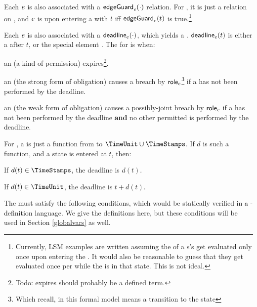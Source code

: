 \documentclass[12pt]{article}
\begin{document}
Each \transition $e$ is also associated with a  $\textsf{edgeGuard}_{e}(\cdot)$ relation. For \FSContracts, it is just a relation on \TimeStamps,
and \atransition $e$ is  upon entering a \GlobalState with \TimeStamp $t$ iff $\textsf{edgeGuard}_{e}(t)$ is true.\footnote{Currently, LSM examples are written assuming the \TGuards of a \State s's \transitions get evaluated only once upon entering the \State. It would also be reasonable to guess that they get evaluated once per \TimeUnit while the \Contract is in that state. This is not ideal.}

\medskip

Each \transition $e$ is also associated with a  $\textsf{deadline}_{e}(\cdot)$, which yields a . $\textsf{deadline}_{e}(t)$ is either a \TimeStamp after $t$, or the special element . The \Deadline for \atransition is when:

\begin{LPPI}
	\item an \enabled \mayntran (a kind of permission) expires\footnote{Todo: expires should probably be a defined term.}.
	\item an \enabled \mustntran (the strong form of obligation) causes a breach by $\textsf{role}_{e}$\footnote{Which recall, in this formal model means a transition to the state \breached{\{\role{\evar}\}}} if a \compatible \Event has not been performed by the deadline.
	\item an \enabled \rmustntran (the weak form of obligation) causes a possibly-joint breach by $\textsf{role}_{e}$ if a \compatible \Event has not been performed by the deadline {\bf and} no other permitted \Event is performed by the deadline.
	\end{LPPI}
For \FSContracts, a \DeadlineFn is just a function from \TimeStamps to $\TimeUnit \cup \TimeStamps$. If $d$ is such a function, and a state is entered at \TimeStamp $t$, then:
\begin{LPPI}
\item If $d(t) \in \TimeStamps$, the deadline is $d(t)$.
	\item If $d(t) \in \TimeUnit$, the deadline is $t + d(t)$.
\end{LPPI}

The \TGuards must satisfy the following conditions, which would be statically verified in a \Contract-definition language. We give the \FSContracts definitions here, but these conditions will be used in Section \ref{globalvars} as well.
\medskip
\end{document}
